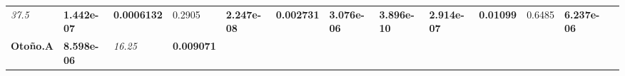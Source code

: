 \documentclass[]{book}
\theoremstyle{definition}
\theoremstyle{definition}
\theoremstyle{definition}
\theoremstyle{remark}
\begin{document}
\begin{longtable}[]{@{}lllllllllllll@{}}
\begin{minipage}[t]{0.05\columnwidth}
\emph{37.5}\strut
\end{minipage} & \begin{minipage}[t]{0.05\columnwidth}\raggedright
\textbf{1.442e-07}\strut
\end{minipage} & \begin{minipage}[t]{0.06\columnwidth}\raggedright
\textbf{0.0006132}\strut
\end{minipage} & \begin{minipage}[t]{0.05\columnwidth}\raggedright
0.2905\strut
\end{minipage} & \begin{minipage}[t]{0.05\columnwidth}\raggedright
\textbf{2.247e-08}\strut
\end{minipage} & \begin{minipage}[t]{0.05\columnwidth}\raggedright
\textbf{0.002731}\strut
\end{minipage} & \begin{minipage}[t]{0.06\columnwidth}\raggedright
\textbf{3.076e-06}\strut
\end{minipage} & \begin{minipage}[t]{0.05\columnwidth}\raggedright
\textbf{3.896e-10}\strut
\end{minipage} & \begin{minipage}[t]{0.05\columnwidth}\raggedright
\textbf{2.914e-07}\strut
\end{minipage} & \begin{minipage}[t]{0.05\columnwidth}\raggedright
\textbf{0.01099}\strut
\end{minipage} & \begin{minipage}[t]{0.06\columnwidth}\raggedright
0.6485\strut
\end{minipage} & \begin{minipage}[t]{0.05\columnwidth}\raggedright
\textbf{6.237e-06}\strut
\end{minipage}\tabularnewline
\begin{minipage}[t]{0.06\columnwidth}\raggedright
\textbf{Otoño.A}\strut
\end{minipage} & \begin{minipage}[t]{0.05\columnwidth}\raggedright
\textbf{8.598e-06}\strut
\end{minipage} & \begin{minipage}[t]{0.05\columnwidth}\raggedright
\emph{16.25}\strut
\end{minipage} & \begin{minipage}[t]{0.06\columnwidth}\raggedright
\textbf{0.009071}\strut
\end{minipage} & \begin{minipage}[t]{0.05\columnwidth}\raggedright

\end{minipage}
\end{longtable}
\end{document}
